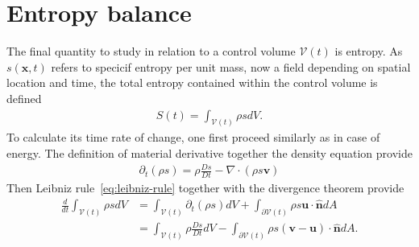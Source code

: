 \section{Entropy balance}
The final quantity to study in relation to a control volume $\mathcal{V}(t)$ is entropy. As $s(\bm{x},t)$ refers to specicif entropy per unit mass, now a field depending on spatial location and time, the total entropy contained within the control volume is defined
\begin{align}
    S(t)=\int_{\mathcal{V}(t)}\rho s dV.
\end{align}
To calculate its time rate of change, one first proceed similarly as in case of energy. The definition of material derivative together the density equation provide
\begin{align}
    \partial_t(\rho s)=\rho\frac{Ds}{Dt}-\nabla\cdot(\rho s\bm{v})
\end{align}
Then Leibniz rule~\eqref{eq:leibniz-rule} together with the divergence theorem provide
\begin{align}
    \frac{d}{dt}\int_{\mathcal{V}(t)}\rho s dV&=\int_{\mathcal{V}(t)}\partial_t(\rho s)dV+\int_{\partial\mathcal{V}(t)}\rho s\bm{u}\cdot\bm{\hat{n}}dA\nonumber\\
    &=\int_{\mathcal{V}(t)}\rho\frac{Ds}{Dt}dV-\int_{\partial\mathcal{V}(t)}\rho s(\bm{v}-\bm{u})\cdot\bm{\hat{n}}dA.
\end{align}

